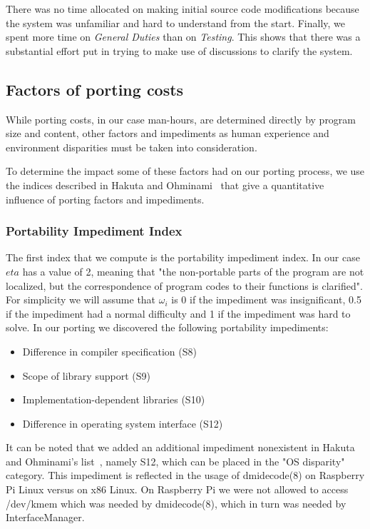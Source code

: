 There was no time allocated on making initial source code modifications because
the system was unfamiliar and hard to understand from the start. Finally, we
spent more time on \textit{General Duties} than on \textit{Testing}. This shows
that there was a substantial effort put in trying to make use of discussions
to clarify the system.

\subsection{Factors of porting costs}

While porting costs, in our case man-hours, are determined directly by program
size and content, other factors and impediments as human experience and
environment disparities must be taken into consideration.

To determine the impact some of these factors had on our porting process, we
use the indices described in Hakuta and Ohminami~\cite{b2} that give
a quantitative influence of porting factors and impediments.

\subsubsection{Portability Impediment Index}

The first index that we compute is the portability impediment index. In our
case $eta$ has a value of 2, meaning that "the non-portable parts of the program
are not localized, but the correspondence of program codes to their functions is
clarified". For simplicity we will assume that $\omega_i$ is 0 if the impediment
was insignificant, 0.5 if the impediment had a normal difficulty and 1 if the
impediment was hard to solve. In our porting we discovered the following
portability impediments:
\begin{itemize}
    \item Difference in compiler specification (S8)
    \item Scope of library support (S9)
    \item Implementation-dependent libraries (S10)
    \item Difference in operating system interface (S12)
\end{itemize}

It can be noted that we added an additional impediment nonexistent in Hakuta and
Ohminami's list~\cite{b2}, namely S12, which can be placed in the "OS disparity"
category. This impediment is reflected in the usage of dmidecode(8) on Raspberry
Pi Linux versus on x86 Linux. On Raspberry Pi we were not allowed to access
/dev/kmem which was needed by dmidecode(8), which in turn was needed by
InterfaceManager.

